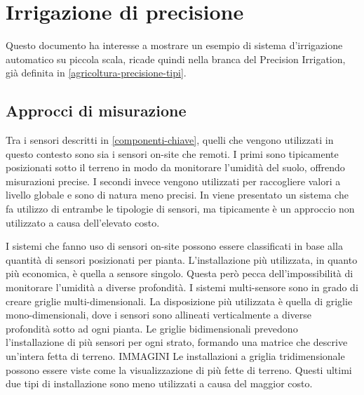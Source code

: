 \documentclass[12pt,a4paper,openright,twoside]{book}
\begin{document}
\section{Irrigazione di precisione}
\label{irrigazione-di-precisione}

Questo documento ha interesse a mostrare un esempio di sistema d'irrigazione automatico su piccola scala, ricade quindi nella branca del Precision Irrigation, già definita in \cref{agricoltura-precisione-tipi}.


\subsection{Approcci di misurazione}\label{approcci-misurazione}

Tra i sensori descritti in \cref{componenti-chiave}, quelli che vengono utilizzati in questo contesto sono sia i sensori on-site che remoti.
I primi sono tipicamente posizionati sotto il terreno in modo da monitorare l'umidità del suolo, offrendo misurazioni precise.
I secondi invece vengono utilizzati per raccogliere valori a livello globale e sono di natura meno precisi.
In \cite{Babaeian2021} viene presentato un sistema che fa utilizzo di entrambe le tipologie di sensori, ma tipicamente è un approccio non utilizzato a causa dell'elevato costo.

I sistemi che fanno uso di sensori on-site possono essere classificati in base alla quantità di sensori posizionati per pianta. L'installazione più utilizzata, in quanto più economica, è quella a sensore singolo. Questa però pecca dell'impossibilità di monitorare l'umidità a diverse profondità\cite{Arif2013}.
I sistemi multi-sensore sono in grado di creare griglie multi-dimensionali.
La disposizione più utilizzata è quella di griglie mono-dimensionali, dove i sensori sono allineati verticalmente a diverse profondità sotto ad ogni pianta\cite{Karandish2016, Goldstein2017, Jimnez2020}.
Le griglie bidimensionali\cite{Egea2016, Cordeiro2016} prevedono l'installazione di più sensori per ogni strato, formando una matrice che descrive un'intera fetta di terreno. IMMAGINI
Le installazioni a griglia tridimensionale\cite{ZapataSierra2021, Liang2021}  possono essere viste come la visualizzazione di più fette di terreno.
Questi ultimi due tipi di installazione sono meno utilizzati a causa del maggior costo.
\end{document}
